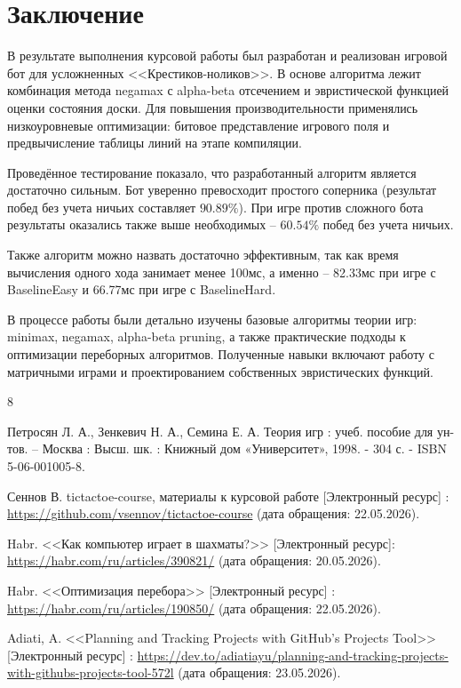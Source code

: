 \documentclass[14pt]{extreport}
\begin{document}
\newpage
{\centering\section*{Заключение}}
В результате выполнения курсовой работы был разработан и реализован игровой бот для усложненных <<Крестиков-ноликов>>. В основе алгоритма лежит комбинация метода negamax с alpha-beta отсечением и эвристической функцией оценки состояния доски. Для повышения производительности применялись низкоуровневые оптимизации: битовое представление игрового поля и предвычисление таблицы линий на этапе компиляции.

Проведённое тестирование показало, что разработанный алгоритм является достаточно сильным. Бот уверенно превосходит простого соперника (результат побед без учета ничьих составляет $90.89 \%$). При игре против сложного бота результаты оказались также выше необходимых -- $60.54 \%$ побед без учета ничьих.

Также алгоритм можно назвать достаточно эффективным, так как время вычисления одного хода занимает менее 100мс, а именно -- 82.33мс при игре с BaselineEasy и 66.77мс при игре с BaselineHard.

В процессе работы были детально изучены базовые алгоритмы теории игр: minimax, negamax, alpha-beta pruning, а также практические подходы к оптимизации переборных алгоритмов. Полученные навыки включают работу с матричными играми и проектированием собственных эвристических функций.

\newpage
\renewcommand{\bibname}{\vspace{-3.2cm}\centering\LargeСписок используемых источников}
\begin{thebibliography}{8}

Петросян Л. А., Зенкевич Н. А., Семина Е. А. Теория игр : учеб. пособие для ун-тов. -- Москва : Высш. шк. : Книжный дом «Университет», 1998. - 304 с. - ISBN 5-06-001005-8.

Сеннов В. tictactoe-course, материалы к курсовой работе [Электронный ресурс] : 
\href{https://github.com/vsennov/tictactoe-course}{https://github.com/vsennov/tictactoe-course} 
(дата обращения: 22.05.2026).

Habr. <<Как компьютер играет в шахматы?>> [Электронный ресурс]: 
\href{https://habr.com/ru/articles/390821/}{https://habr.com/ru/articles/390821/} 
(дата обращения: 20.05.2026).

Habr. <<Оптимизация перебора>> [Электронный ресурс] : 
\href{https://habr.com/ru/articles/190850/}{https://habr.com/ru/articles/190850/} 
(дата обращения: 22.05.2026).

Adiati, A. <<Planning and Tracking Projects with GitHub's Projects Tool>> [Электронный ресурс] : 
\href{https://dev.to/adiatiayu/planning-and-tracking-projects-with-githubs-projects-tool-572l}{https://dev.to/adiatiayu/planning-and-tracking-projects-with-githubs-projects-tool-572l} 
(дата обращения: 23.05.2026).

\end{thebibliography}
\end{document}

